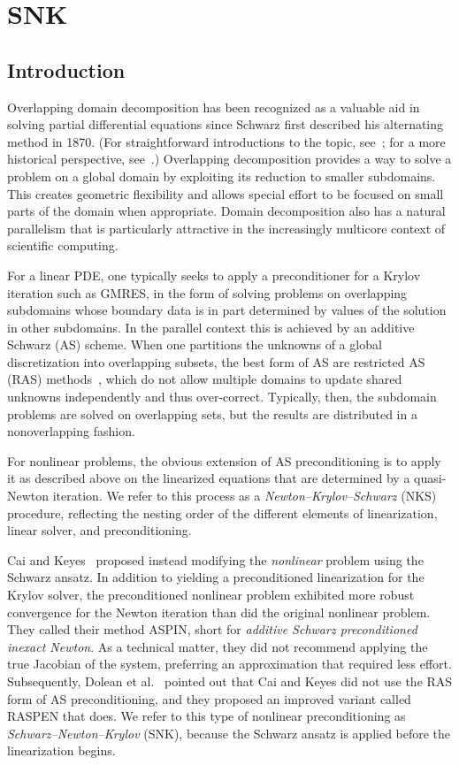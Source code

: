 \chapter{SNK}

\section{Introduction}
\label{sec:introduction}

Overlapping domain decomposition has been recognized as a valuable aid in solving partial differential equations since Schwarz first described his alternating method in 1870. (For straightforward introductions to the topic, see~\cite{Dolean2015,Smith2004}; for a more historical perspective, see~\cite{Gander2008}.) Overlapping decomposition provides a way to solve a problem on a global domain by exploiting its reduction to smaller subdomains. This creates geometric flexibility and allows special effort to be focused on small parts of the domain when appropriate. Domain decomposition also has a natural parallelism that is particularly attractive in the increasingly multicore context of scientific computing.

For a linear PDE, one typically seeks to apply a preconditioner for a Krylov iteration such as GMRES, in the form of solving problems on overlapping subdomains whose boundary data is in part determined by values of the solution in other subdomains. In the parallel context this is achieved by an additive Schwarz (AS) scheme. When one partitions the unknowns of a global discretization into overlapping subsets, the best form of AS are restricted AS (RAS) methods~\cite{Cai1999}, which do not allow multiple domains to update shared unknowns independently and thus over-correct. Typically, then, the subdomain problems are solved on overlapping sets, but the results are distributed in a nonoverlapping fashion. 

For nonlinear problems, the obvious extension of AS preconditioning is to apply it as described above on the linearized equations that are determined by a quasi-Newton iteration. We refer to this process as a \emph{Newton--Krylov--Schwarz} (NKS) procedure, reflecting the nesting order of the different elements of linearization, linear solver, and preconditioning.

Cai and Keyes~\cite{Cai2002} proposed instead modifying the \emph{nonlinear} problem using the Schwarz ansatz. In addition to yielding a preconditioned linearization for the Krylov solver, the preconditioned nonlinear problem exhibited more robust convergence for the Newton iteration than did the original nonlinear problem. They called their method ASPIN, short for \textit{additive Schwarz preconditioned inexact Newton}. As a technical matter, they did not recommend applying the true Jacobian of the system, preferring an approximation that required less effort. Subsequently, Dolean et al.~\cite{Dolean2016} pointed out that Cai and Keyes did not use the RAS form of AS preconditioning, and they proposed an improved variant called RASPEN that does. We refer to this type of nonlinear preconditioning as \emph{Schwarz--Newton--Krylov} (SNK), because the Schwarz ansatz is applied before the linearization begins.

